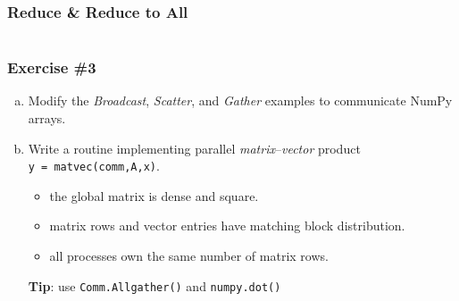 \begin{frame}
  \frametitle{Reduce \& Reduce to All}
  \inputminted[linenos]{python}{coll_reduce.py}
\end{frame}

\begin{frame}
  \frametitle{Exercise \#3}
  \begin{enumerate}[a)]
  \item Modify the \emph{Broadcast}, \emph{Scatter}, and \emph{Gather}
    examples to communicate NumPy arrays.
  \item Write a routine implementing parallel
    \emph{matrix}--\emph{vector} product
    \texttt{y~=~matvec(comm,A,x)}.
    \begin{itemize}
    \item the global matrix is dense and square.
    \item matrix rows and vector entries have matching block
      distribution.
    \item all processes own the same number of matrix rows.
    \end{itemize}
    \textbf{Tip}: use \texttt{Comm.Allgather()} and \texttt{numpy.dot()}
  \end{enumerate}
\end{frame}

